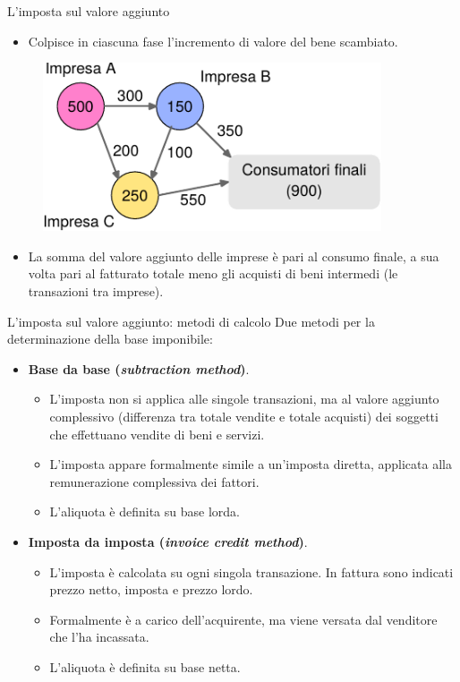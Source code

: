 \documentclass[aspectratio=64,11pt]{beamer}
\begin{document}
\begin{frame}{L'imposta sul valore aggiunto}
\begin{itemize}
\item Colpisce in ciascuna fase l'\alert{incremento} di valore del bene scambiato.
\end{itemize}

\begin{figure}[htbp]
\centering
\includegraphics[width=10cm]{./figure/flussi-VA-metaflow-1.pdf}
\end{figure}

\begin{itemize}
\item La somma del valore aggiunto delle imprese è pari al consumo finale, a sua
volta pari al fatturato totale meno gli acquisti di beni intermedi (le
transazioni tra imprese).
\end{itemize}
\end{frame}

\begin{frame}{L'imposta sul valore aggiunto: metodi di calcolo}
Due metodi per la determinazione della base imponibile:
\begin{itemize}
\item \textbf{Base da base (\emph{subtraction method})}.
\begin{itemize}
\item L'imposta non si applica alle singole transazioni, ma al valore aggiunto
complessivo (differenza tra totale vendite e totale acquisti) dei soggetti
che effettuano vendite di beni e servizi.
\item L'imposta appare formalmente simile a un'imposta diretta, applicata alla
remunerazione complessiva dei fattori.
\item L'aliquota è definita \alert{su base lorda}.
\end{itemize}

\item \textbf{Imposta da imposta (\emph{invoice credit method})}.
\begin{itemize}
\item L'imposta è calcolata su ogni singola transazione. In fattura sono
indicati prezzo netto, imposta e prezzo lordo.
\item Formalmente è a carico dell'acquirente, ma viene versata dal venditore che
l'ha incassata.
\item L'aliquota è definita \alert{su base netta}.
\end{itemize}
\end{itemize}
\end{frame}
\end{document}
